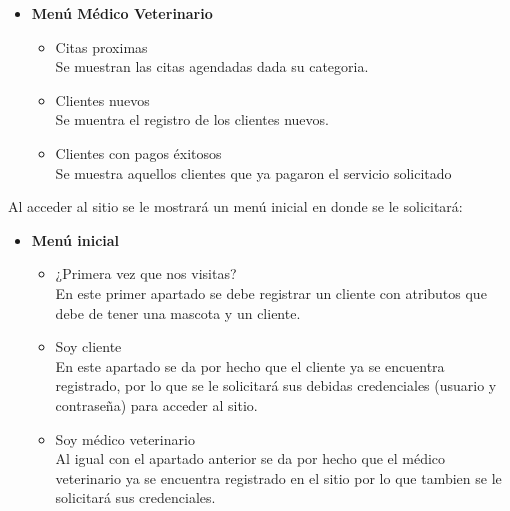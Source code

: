 \documentclass{bachw}
\begin{document}
\begin{itemize}
    \item \textbf{Menú Médico Veterinario}
    \begin{itemize}
        \item Citas proximas\\
               Se muestran las citas agendadas dada su categoria.  
        \item Clientes nuevos\\
               Se muentra el registro de los clientes nuevos.  
        \item Clientes con pagos éxitosos\\
              Se muestra aquellos clientes que ya pagaron el servicio solicitado
    \end{itemize}
\end{itemize}

 Al acceder al sitio se le mostrará un menú inicial en donde se le solicitará:

 \begin{itemize}
    \item \textbf{Menú inicial}
          \begin{itemize}
            \item ¿Primera vez que nos visitas?\\
                  En este primer apartado se debe registrar un cliente con atributos que debe de tener una mascota y un cliente.
            \item Soy cliente\\
                  En este apartado se da por hecho que el cliente ya se encuentra registrado, por lo que se
                  le solicitará sus debidas credenciales (usuario y contraseña) para acceder al sitio.  
            \item Soy médico veterinario\\
                  Al igual con el apartado anterior se da por hecho que el médico veterinario ya se encuentra 
                  registrado en el sitio por lo que tambien se le solicitará sus credenciales.
          \end{itemize}   
 \end{itemize}


\end{document}

